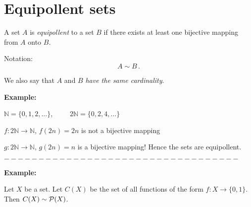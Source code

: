 \documentclass[11pt,paper=b5,footinclude,headinclude]{scrbook} %
\theoremstyle{remark}
\theoremstyle{definition} %
\theoremstyle{theorem} %
\begin{document}
\section{Equipollent sets}

A set $A$ is {\em equipollent} to a set $B$ if there exists at least one bijective mapping from $A$ onto $B$.

Notation: $$A\sim B\,.$$

We also say that $A$ and $B$ \emph{ have the same cardinality}.



\textbf{ Example:}

$\mathbb{N} = \{0,1,2,\ldots\}$,~~~~~$2\mathbb{N} = \{0,2,4,\ldots\}$

$f: 2\mathbb{N} \to \mathbb{N}$, $f(2n) = 2n$ is not a bijective mapping

$g: 2\mathbb{N} \to \mathbb{N}$, $g(2n) = n$ is a bijective mapping!
Hence the sets are equipollent.


\bigskip
$----------------------------------$
\bigskip

\textbf{ Example:}

Let $X$ be a set.
Let $C(X)$ be the set of all functions of the form $f: X\to \{0,1\}$.
Then $C(X)\sim {\cal P}(X)$.
\end{document}
